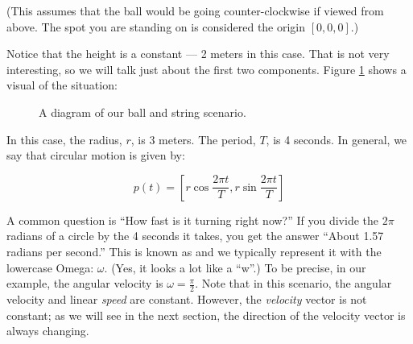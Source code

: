 (This assumes that the ball would be going counter-clockwise if viewed
from above. The spot you are standing on is considered the origin $[0, 0, 0]$.)

Notice that the height is a constant --- 2 meters in this
case. That is not very interesting, so we will talk just about the
first two components. Figure \ref{fig:billiardBall} shows a visual of the situation:


\begin{figure}[H]
  \begin{center}
  \end{center}
  \caption{A diagram of our ball and string scenario.}
  \label{fig:billiardBall}
\end{figure}

In this case, the radius, $r$, is 3 meters. The period, $T$, is 4
seconds. In general, we say that circular motion is given by:

$$p(t) = \left[ r \cos{\frac{2 \pi t}{T}}, r \sin{\frac{2 \pi t}{T}}\right]$$

A common question is ``How fast is it turning right now?''  If you
divide the $2\pi$ radians of a circle by the 4 seconds it takes, you
get the answer ``About 1.57 radians per second.''  This is known as
 and we typically represent it with the
lowercase Omega: $\omega$. (Yes, it looks a lot like a ``w''.)  To be
precise, in our example, the angular velocity is $\omega = \frac{\pi}{2}$. Note that in this scenario, the angular velocity and linear \emph{speed} are constant. However, the \emph{velocity} vector is not constant; as we will see in the next section, the direction of the velocity vector is always changing.

